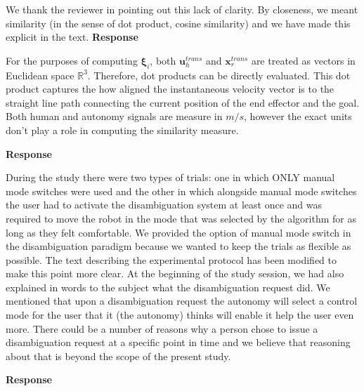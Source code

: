 \documentclass[a4paper,twoside,11pt]{reviewresponse}
\begin{document}
We thank the reviewer in pointing out this lack of clarity. By closeness, we meant similarity (in the sense of dot product, cosine similarity) and we have made this explicit in the text.
\textbf{Response}

For the purposes of computing $\boldsymbol{\xi}_i$,  both $\boldsymbol{u}_h^{trans}$ and $\boldsymbol{x}_r^{trans}$ are treated as vectors in Euclidean space $\mathbb{R}^3$. Therefore, dot products can be directly evaluated. This dot product captures the how aligned the instantaneous velocity vector is to the straight line path connecting the current position of the end effector and the goal. Both human and autonomy signals are measure in $m/s$, however the exact units don't play a role in computing the similarity measure. 


\textbf{Response}

During the study there were two types of trials: one in which ONLY manual mode switches were used and the other in which alongside manual mode switches the user had to activate the disambiguation system at least once and was required to move the robot in the mode that was selected by the algorithm for as long as they felt comfortable. We provided the option of manual mode switch in the disambiguation paradigm because we wanted to keep the trials as flexible as possible. The text describing the experimental protocol has been modified to make this point more clear. At the beginning of the study session, we had also explained in words to the subject what the disambiguation request did. We mentioned that upon a disambiguation request the autonomy will select a control mode for the user that it (the autonomy) thinks will enable it help the user even more. There could be a number of reasons why a person chose to issue a disambiguation request at a specific point in time and we believe that reasoning about that is beyond the scope of the present study. 

\textbf{Response}
\end{document}
